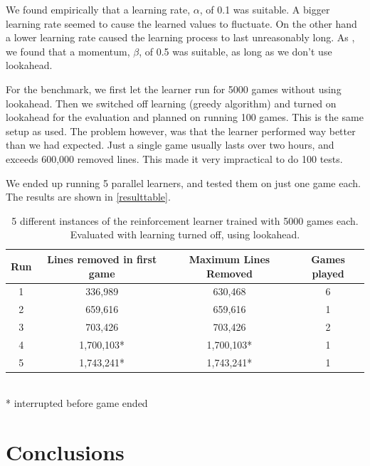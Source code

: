 \documentclass{ml}
\begin{document}
We found empirically that a learning rate, $\alpha$, of 0.1 was suitable. A bigger learning rate seemed to cause the learned values to fluctuate.
On the other hand a lower learning rate caused the learning process to last unreasonably long. 
As \cite{zucker2009learning}, we found that a momentum, $\beta$, of 0.5 was suitable, as long as we don't use lookahead.

For the benchmark, we first let the learner run for 5000 games without using lookahead.
Then we switched off learning (greedy algorithm) and turned on lookahead for the evaluation and planned on running 100 games.
This is the same setup as \cite{zucker2009learning} used.
The problem however, was that the learner performed way better than we had expected. Just a single game usually lasts over two hours, and exceeds 600,000 removed lines.
This made it very impractical to do 100 tests. 

We ended up running 5 parallel learners, and tested them on just one game each. 
The results are shown in \autoref{resulttable}.

\begin{table}
\begin{center}
\begin{tabular}{|c|c|c|c|}
\hline 
Run & Lines removed in first game & Maximum Lines Removed & Games played\\ 
\hline 
1 & 336,989 & 630,468 & 6 \\ 
\hline 
2 & 659,616 & 659,616 & 1 \\ %
\hline 
3 & 703,426 & 703,426 & 2 \\ %
\hline 
4 & 1,700,103* & 1,700,103* & 1\\ 
\hline 
5 & 1,743,241* & 1,743,241* & 1\\ 
\hline 
\end{tabular}\\
\tiny{* interrupted before game ended} 
\end{center}

\caption{\footnotesize{5 different instances of the reinforcement learner trained with 5000 games each. Evaluated with learning turned off, using lookahead.}}
\label{resulttable}

\end{table}


\section{Conclusions}
\label{conclusions}
\end{document}
